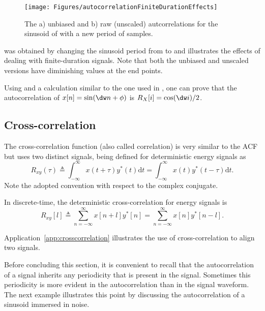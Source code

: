 \begin{figure}
\centering
\texttt{[image: Figures/autocorrelationFiniteDurationEffects]}
\caption{The a) unbiased and b) raw (unscaled) autcorrelations for the sinusoid of  with a new period of  samples.\label{fig:autocorrelationFiniteDurationEffects}}
\end{figure}

 was obtained by changing the sinusoid period from  to  and illustrates the effects of dealing with finite-duration signals. Note that both the unbiased and unscaled versions have diminishing values at the end points.
\eExample

Using  and a calculation similar to the one used in ,
one can prove that the autocorrelation of $x[n]=\sin (\dw n + \phi)$ is $R_X[i]=\cos(\dw i)/2$.

\subsection{Cross-correlation}
The cross-correlation function (also called correlation) is very similar to the ACF but uses two distinct signals, being defined for deterministic energy signals as
\[
R_{xy}(\tau) \triangleq \int_{-\infty}^{\infty} x(t+\tau) y^*(t) \textrm{d}t = \int_{-\infty}^{\infty} x(t) y^*(t-\tau) \textrm{d}t.
\]
Note the adopted convention with respect to the complex conjugate. 

In discrete-time, the deterministic cross-correlation for energy signals is
\[
R_{xy}[l] \triangleq \sum_{n=-\infty}^{\infty} x[n+l] y^*[n] = \sum_{n=-\infty}^{\infty} x[n] y^*[n-l].
\]

Application~\ref{app:crosscorrelation} illustrates the use of cross-correlation to align two signals.

Before concluding this section, it is convenient to recall that the autocorrelation of a signal inherits any periodicity that is present in the signal. Sometimes this periodicity is more evident in the autocorrelation than in the signal waveform. The next example illustrates this point by discussing the autocorrelation of a sinusoid immersed in noise.

